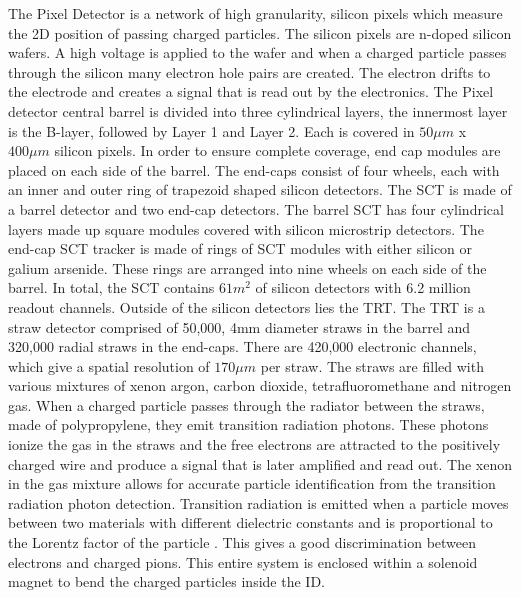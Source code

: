 \indent The Pixel Detector is a network of high granularity, silicon pixels which measure the 2D position of passing charged particles. The silicon pixels are n-doped silicon wafers. A high voltage is applied to the wafer and when a charged particle passes through the silicon many electron hole pairs are created. The electron drifts to the electrode and creates a signal that is read out by the electronics.  The Pixel detector central barrel is divided into three cylindrical layers, the innermost layer is the B-layer, followed by Layer 1 and Layer 2. Each is covered in ${50\mu{m}}$ x ${400\mu{m}}$ silicon pixels. In order to ensure complete coverage, end cap modules are placed on each side of the barrel. The end-caps consist of four wheels, each with an inner and outer ring of trapezoid shaped silicon detectors. \newline
\indent The SCT is made of a barrel detector and two end-cap detectors. The barrel SCT has four cylindrical layers made up square modules covered with silicon microstrip detectors. 
The end-cap SCT tracker is made of rings of SCT modules with either silicon or galium arsenide. These rings are arranged into nine wheels on each side of the barrel. In total, the SCT contains ${61 m^{2}}$ of silicon detectors with 6.2 million readout channels.\newline
\indent Outside of the silicon detectors lies the TRT. The TRT is a straw detector comprised of 50,000, 4mm diameter straws in the barrel and 320,000 radial straws in the end-caps. There are 420,000 electronic channels, which give a spatial resolution of ${170\mu{m}}$ per straw. The straws are filled with various mixtures of xenon argon, carbon dioxide, tetrafluoromethane and nitrogen gas. When a charged particle passes through the radiator between the straws, made of polypropylene, they emit transition radiation photons. These photons ionize the gas in the straws and the free electrons are attracted to the positively charged wire and produce a signal that is later amplified and read out. The xenon in the gas mixture allows for accurate particle identification from the transition radiation photon detection. Transition radiation is emitted when a particle moves between two materials with different dielectric constants and is proportional to the Lorentz factor of the particle \cite{DOLGOSHEIN1993434}. This gives a good discrimination between electrons and charged pions. This entire system is enclosed within a solenoid magnet to bend the charged particles inside the ID.\newline

